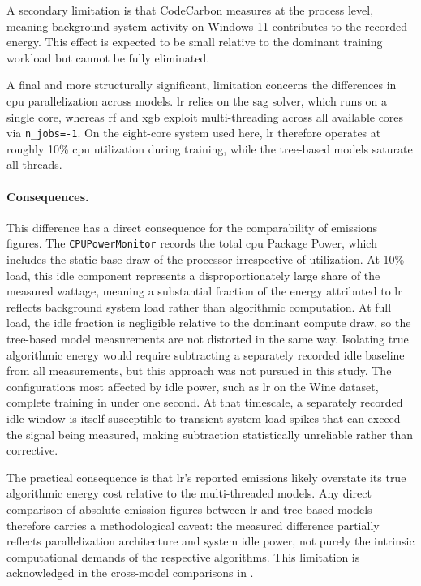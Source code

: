 A secondary limitation is that CodeCarbon measures at the process level, meaning background system activity on Windows 11 contributes to the recorded energy. This effect is expected to be small relative to the dominant training workload but cannot be fully eliminated.

A final and more structurally significant, limitation concerns the differences in \gls{cpu} parallelization across models. \gls{lr} relies on the \gls{sag} solver, which runs on a single core, whereas \gls{rf} and \gls{xgb} exploit multi-threading across all available cores via \texttt{n\_jobs=-1}. On the eight-core system used here, \gls{lr} therefore operates at roughly 10\% \gls{cpu} utilization during training, while the tree-based models saturate all threads.

\paragraph{Consequences.}
This difference has a direct consequence for the comparability of emissions figures. The \texttt{CPUPowerMonitor} records the total \gls{cpu} Package Power, which includes the static base draw of the processor irrespective of utilization. At 10\% load, this idle component represents a disproportionately large share of the measured wattage, meaning a substantial fraction of the energy attributed to \gls{lr} reflects background system load rather than algorithmic computation. At full load, the idle fraction is negligible relative to the dominant compute draw, so the tree-based model measurements are not distorted in the same way. Isolating true algorithmic energy would require subtracting a separately recorded idle baseline from all measurements, but this approach was not pursued in this study. The configurations most affected by idle power, such as \gls{lr} on the Wine dataset, complete training in under one second. At that timescale, a separately recorded idle window is itself susceptible to transient system load spikes that can exceed the signal being measured, making subtraction statistically unreliable rather than corrective.

The practical consequence is that \gls{lr}'s reported emissions likely overstate its true algorithmic energy cost relative to the multi-threaded models. Any direct comparison of absolute emission figures between \gls{lr} and tree-based models therefore carries a methodological caveat: the measured difference partially reflects parallelization architecture and system idle power, not purely the intrinsic computational demands of the respective algorithms. This limitation is acknowledged in the cross-model comparisons in .


